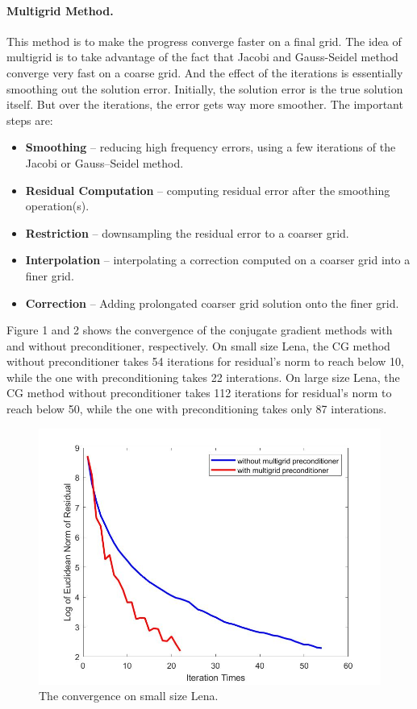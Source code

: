 \documentclass{article}
\begin{document}
\paragraph{Multigrid Method.} This method is to make the progress converge faster on a final grid. The idea of multigrid is to take advantage of the fact that Jacobi and Gauss-Seidel method converge very fast on a coarse grid. And the effect of the iterations is essentially smoothing out the solution error. Initially, the solution error is the true solution itself. But over the iterations, the error gets way more smoother. The important steps are:
\begin{itemize}
    \item \textbf{Smoothing} – reducing high frequency errors, using a few iterations of the Jacobi or Gauss–Seidel method.
    \item \textbf{Residual Computation} – computing residual error after the smoothing operation(s).
    \item \textbf{Restriction} – downsampling the residual error to a coarser grid.
    \item \textbf{Interpolation} – interpolating a correction computed on a coarser grid into a finer grid.
    \item \textbf{Correction} – Adding prolongated coarser grid solution onto the finer grid.
\end{itemize}
Figure 1 and 2 shows the convergence of the conjugate gradient methods with and without preconditioner, respectively. On small size Lena, the CG method without preconditioner takes 54 iterations for residual's norm to reach below 10, while the one with preconditioning takes 22 interations. On large size Lena, the CG method without preconditioner takes 112 iterations for residual's norm to reach below 50, while the one with preconditioning takes only 87 interations.
\begin{figure}[H]
   \centering
   \includegraphics[scale=0.3]{figure/convergence_lena.jpg}
   \caption{The convergence on small size Lena.}
\end{figure}
\end{document}
